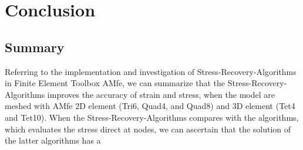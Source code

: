 \chapter{Conclusion}
\section{Summary}
Referring to the implementation and investigation of Stress-Recovery-Algorithms in Finite Element Toolbox AMfe, we can summarize that the Stress-Recovery-Algorithms improves the accuracy of strain and stress, when the model are meshed with AMfe 2D element (Tri6, Quad4, and Quad8) and 3D element (Tet4 and Tet10). When the Stress-Recovery-Algorithms compares with the algorithms, which evaluates the stress direct at nodes, we can ascertain that the solution of the latter algorithms has a  


